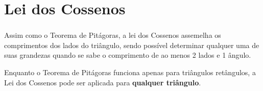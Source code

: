\documentclass[handout]{beamer}
\begin{document}

\section{Lei dos Cossenos}

\begin{frame}[fragile]\frametitle{\secname}
    Assim como o Teorema de Pitágoras, a lei dos Cossenos assemelha os comprimentos
    dos lados do triângulo, sendo possível determinar qualquer uma de suas grandezas 
    quando se sabe o comprimento de ao menos 2 lados e 1 ângulo.
    \begin{figure}[H]
        \centering
    \end{figure}

    Enquanto o Teorema de Pitágoras funciona apenas para triângulos retângulos, 
    a Lei dos Cossenos pode ser aplicada para \textbf{qualquer triângulo}.

\end{frame}

\end{document}
